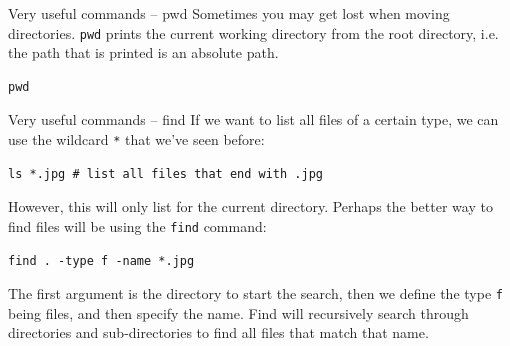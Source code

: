 \documentclass[10pt]{beamer}
\begin{document}
\begin{frame}[label={sec:org010064e},fragile]{Very useful commands -- pwd}
 Sometimes you may get lost when moving directories. \texttt{pwd} prints the current
working directory from the root directory, i.e. the path that is printed is an
absolute path.

\begin{verbatim}
pwd
\end{verbatim}
\end{frame}

\begin{frame}[label={sec:org21e8dd3},fragile]{Very useful commands -- find}
 If we want to list all files of a certain type, we can use the wildcard \texttt{*} that
we've seen before:

\begin{verbatim}
ls *.jpg # list all files that end with .jpg
\end{verbatim}

However, this will only list for the current directory. Perhaps the better way
to find files will be using the \texttt{find} command:

\begin{verbatim}
find . -type f -name *.jpg
\end{verbatim}

The first argument is the directory to start the search, then we define the type
\texttt{f} being files, and then specify the name. Find will recursively search through
directories and sub-directories to find all files that match that name.
\end{frame}
\end{document}
